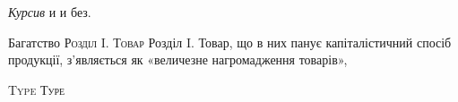 \documentclass{kapital}
\begin{document}
    \emph{Курсив} и  и без.

    Багатство {\sffamily\scshape Розділ I. Товар} {\sffamily Розділ I. Товар}, що в них панує капіталістичний спосіб
продукції, з’являється як «величезне нагромадження товарів»,

	{\large\sffamily\scshape Type Туре}
\end{document}
